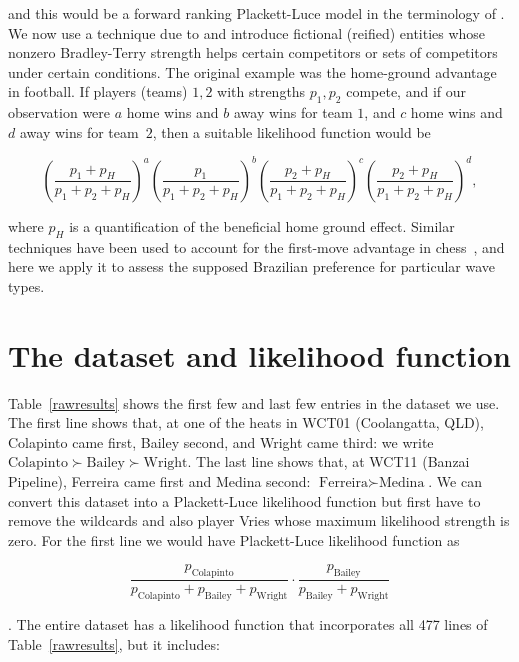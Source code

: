 \documentclass{article}
\begin{document}
and this would be a forward ranking Plackett-Luce model in the
terminology of \citet{johnson2020}.  We now use a technique due to
\citet{hankin2010,hankin2017_nomarkup} and introduce fictional (reified)
entities whose nonzero Bradley-Terry strength helps certain
competitors or sets of competitors under certain conditions.  The
original example was the home-ground advantage in football.  If
players (teams) $1,2$ with strengths $p_1,p_2$ compete, and if our
observation were $a$ home wins and $b$ away wins for team $1$, and $c$
home wins and $d$ away wins for team~$2$, then a suitable likelihood
function would be

\begin{equation}\label{home_ground_advantage}
\left(\frac{p_1+p_H}{p_1+p_2+p_H}\right)^a
\left(\frac{p_1}{p_1+p_2+p_H}\right)^b
\left(\frac{p_2+p_H}{p_1+p_2+p_H}\right)^c
\left(\frac{p_2+p_H}{p_1+p_2+p_H}\right)^d,
\end{equation}

\noindent where $p_H$ is a quantification of the beneficial home
ground effect.  Similar techniques have been used to account for the
first-move advantage in chess~\citep{hankin2020}, and here we apply it
to assess the supposed Brazilian preference for particular wave types.

\section{The dataset and likelihood function}

Table~\ref{rawresults} shows the first few and last few entries in the
dataset we use.  The first line shows that, at one of the heats in
WCT01 (Coolangatta, QLD), Colapinto came first, Bailey second, and
Wright came third: we write
$\mbox{Colapinto}\succ\mbox{Bailey}\succ\mbox{Wright}$.  The last line
shows that, at WCT11 (Banzai Pipeline), Ferreira came first and Medina
second: $\mbox{Ferreira}\succ\mbox{Medina}$.  We can convert this
dataset into a Plackett-Luce likelihood function but first have to
remove the wildcards and also player Vries whose maximum likelihood
strength is zero.  For the first line we would have Plackett-Luce
likelihood function as

\begin{equation}
\frac{p_\mathrm{Colapinto}}{p_\mathrm{Colapinto} + p_\mathrm{Bailey} + p_\mathrm{Wright}}\cdot
\frac{p_\mathrm{Bailey}}{p_\mathrm{Bailey} + p_\mathrm{Wright}}
\end{equation}

.  The entire dataset has a likelihood function
that incorporates all 477 lines of Table~\ref{rawresults}, but it
includes:
\end{document}
